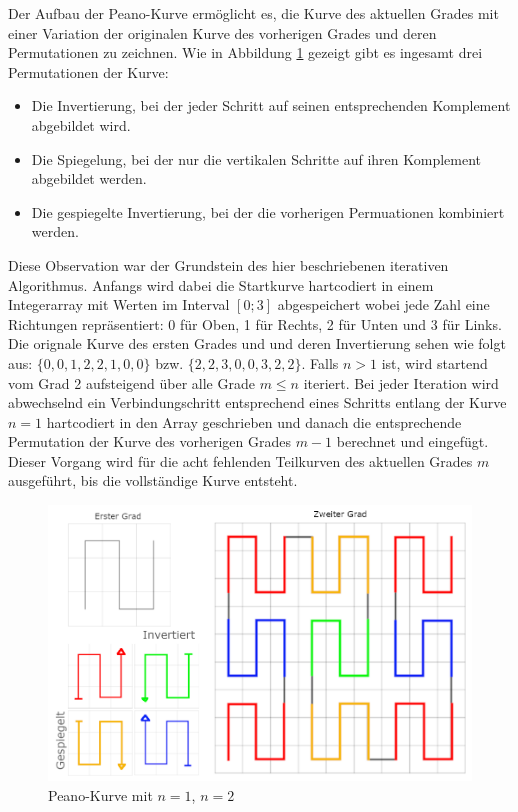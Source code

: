 \documentclass[course=asp]{aspdoc}
\begin{document}
Der Aufbau der Peano-Kurve erm\"oglicht es, die Kurve des aktuellen Grades mit einer Variation der originalen Kurve des vorherigen Grades und deren Permutationen zu zeichnen. Wie in Abbildung \ref{Abb:Peano L\"osungsidee} gezeigt gibt es ingesamt drei Permutationen der Kurve:

\begin{itemize}
    \item Die Invertierung, bei der jeder Schritt auf seinen entsprechenden Komplement abgebildet wird.
    \item Die Spiegelung, bei der nur die vertikalen Schritte auf ihren Komplement abgebildet werden.
    \item Die gespiegelte Invertierung, bei der die vorherigen Permuationen kombiniert werden.
\end{itemize}

Diese Observation war der Grundstein des hier beschriebenen iterativen Algorithmus. Anfangs wird dabei die Startkurve hartcodiert in einem Integerarray mit Werten im Interval $[0;3]$ abgespeichert wobei jede Zahl eine Richtungen repr\"asentiert: 0 f\"ur Oben, 1 f\"ur Rechts, 2 f\"ur Unten und 3 f\"ur Links. Die orignale Kurve des ersten Grades und und deren Invertierung sehen wie folgt aus: $\{0, 0, 1, 2, 2, 1, 0, 0\}$ bzw. $\{2, 2, 3, 0, 0, 3, 2, 2\}$. 
Falls $n > 1$ ist, wird startend vom Grad 2 aufsteigend \"uber alle Grade $m \leq n$ iteriert. Bei jeder Iteration wird abwechselnd ein Verbindungschritt entsprechend eines Schritts entlang der Kurve $n = 1$ hartcodiert in den Array geschrieben und danach die entsprechende Permutation der Kurve des vorherigen Grades $m - 1$ berechnet und eingef\"ugt. Dieser Vorgang wird f\"ur die acht fehlenden Teilkurven des aktuellen Grades $m$ ausgef\"uhrt, bis die vollst\"andige Kurve entsteht.

\begin{figure}[ht]
\centering
\includegraphics[scale=0.3]{PeanoFarbcodiert.png}
\caption{Peano-Kurve mit $n = 1$, $n = 2$}\label{Abb:Peano L\"osungsidee}
\captionsetup[figure]{font=small,labelfont=small}
\end{figure}
\end{document}
